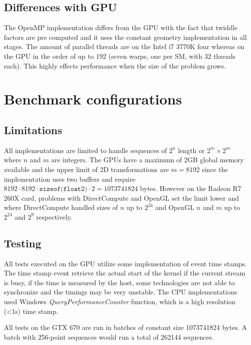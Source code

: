 \subsection{Differences with GPU}

The OpenMP implementation differs from the GPU with the fact that twiddle factors are pre computed and it uses the constant geometry implementation in all stages. The amount of parallel threads are on the Intel i7 3770K four whereas on the GPU in the order of up to 192 (seven warps, one per SM, with 32 threads each). This highly effects performance when the size of the problem grows.

\section{Benchmark configurations}

\subsection{Limitations}

All implementations are limited to handle sequences of $2^n$ length or $2^m \times 2^m$ where $n$ and $m$ are integers. The GPUs have a maximum of 2GB global memory available and the upper limit of 2D transformations are $m = 8192$ since the implementation uses two buffers and require $8192 \cdot 8192 \cdot \texttt{sizeof(float2)} \cdot 2 = 1073741824$ bytes. However on the Radeon R7 260X card, problems with DirectCompute and OpenGL set the limit lower and where DirectCompute handled sizes of $n$ up to $2^{24}$ and OpenGL $n$ and $m$ up to $2^{24}$ and $2^{9}$ respectively.

\subsection{Testing}

All tests executed on the GPU utilize some implementation of event time stamps. The time stamp event retrieve the actual start of the kernel if the current stream is busy, if the time is measured by the host, some technologies are not able to synchronize and the timings may be very unstable. The CPU implementations used Windows \textit{QueryPerformanceCounter} function, which is a high resolution (<1{\micro}s) time stamp.

All tests on the GTX 670 are run in batches of constant size 1073741824 bytes. A batch with 256-point sequences would run a total of 262144 sequences.

